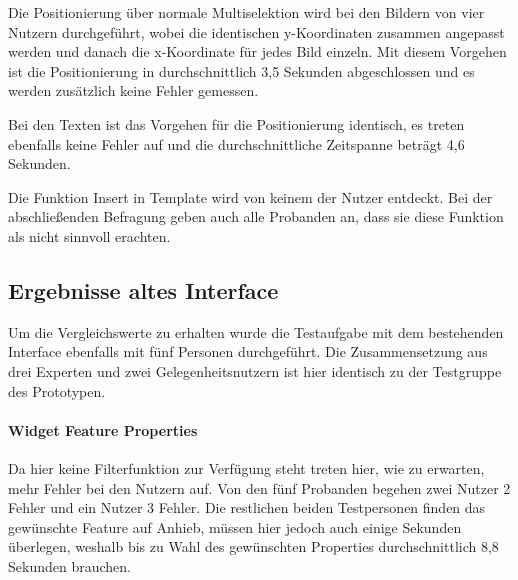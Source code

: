 Die Positionierung über normale Multiselektion wird bei den Bildern von vier Nutzern durchgeführt, wobei die identischen y-Koordinaten zusammen angepasst werden und danach die x-Koordinate für jedes Bild einzeln.
Mit diesem Vorgehen ist die Positionierung in durchschnittlich 3,5 Sekunden abgeschlossen und es werden zusätzlich keine Fehler gemessen.

Bei den Texten ist das Vorgehen für die Positionierung identisch, es treten ebenfalls keine Fehler auf und die durchschnittliche Zeitspanne beträgt 4,6 Sekunden.

Die Funktion \glqq Insert in Template\grqq{} wird von keinem der Nutzer entdeckt. Bei der abschließenden Befragung geben auch alle Probanden an, dass sie diese Funktion als nicht sinnvoll erachten.

\subsection{Ergebnisse altes Interface}
Um die Vergleichswerte zu erhalten wurde die Testaufgabe mit dem bestehenden Interface ebenfalls mit fünf Personen durchgeführt.
Die Zusammensetzung aus drei Experten und zwei Gelegenheitsnutzern ist hier identisch zu der Testgruppe des Prototypen.

\paragraph{Widget Feature Properties}
Da hier keine Filterfunktion zur Verfügung steht treten hier, wie zu erwarten, mehr Fehler bei den Nutzern auf.
Von den fünf Probanden begehen zwei Nutzer 2 Fehler und ein Nutzer 3 Fehler.
Die restlichen beiden Testpersonen finden das gewünschte Feature auf Anhieb, müssen hier jedoch auch einige Sekunden überlegen, weshalb bis zu Wahl des gewünschten Properties durchschnittlich 8,8 Sekunden brauchen.

